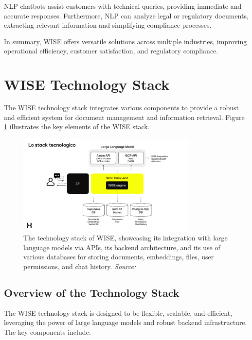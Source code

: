 \begin{itemize}
    NLP chatbots assist customers with technical queries, providing immediate and accurate responses. Furthermore, NLP can analyze legal or regulatory documents, extracting relevant information and simplifying compliance processes.
\end{itemize}

In summary, WISE offers versatile solutions across multiple industries, improving operational efficiency, customer satisfaction, and regulatory compliance. \cite{hpa2024}

\section{WISE Technology Stack}

The WISE technology stack integrates various components to provide a robust and efficient system for document management and information retrieval. Figure \ref{fig:wise-stack} illustrates the key elements of the WISE stack.

\begin{figure}[h!]
    \centering
    \includegraphics[width=0.8\textwidth]{images/wise/wise-stack.png}
    \caption{The technology stack of WISE, showcasing its integration with large language models via APIs, its backend architecture, and its use of various databases for storing documents, embeddings, files, user permissions, and chat history. \textit{Source:} \cite{hpa2024}}
    \label{fig:wise-stack}
\end{figure}

\subsection{Overview of the Technology Stack}

The WISE technology stack is designed to be flexible, scalable, and efficient, leveraging the power of large language models and robust backend infrastructure. The key components include:

